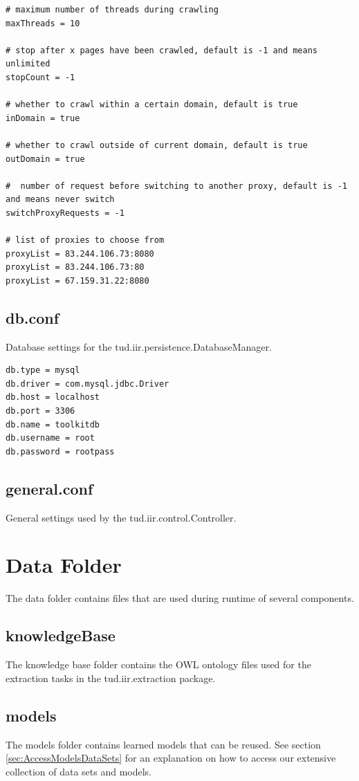 \documentclass[a4paper,twoside]{book}      %
\begin{document}
\begin{verbatim}
# maximum number of threads during crawling
maxThreads = 10

# stop after x pages have been crawled, default is -1 and means unlimited
stopCount = -1

# whether to crawl within a certain domain, default is true
inDomain = true
	
# whether to crawl outside of current domain, default is true
outDomain = true

#  number of request before switching to another proxy, default is -1 and means never switch
switchProxyRequests = -1
	
# list of proxies to choose from
proxyList = 83.244.106.73:8080
proxyList = 83.244.106.73:80
proxyList = 67.159.31.22:8080
\end{verbatim}

\subsection{db.conf}
Database settings for the tud.iir.persistence.DatabaseManager.

\begin{verbatim}
db.type = mysql
db.driver = com.mysql.jdbc.Driver
db.host = localhost
db.port = 3306
db.name = toolkitdb
db.username = root
db.password = rootpass
\end{verbatim}

\subsection{general.conf}
General settings used by the tud.iir.control.Controller.

\section{Data Folder}
The data folder contains files that are used during runtime of several components.

\subsection{knowledgeBase} 
The knowledge base folder contains the OWL ontology files used for the extraction tasks in the tud.iir.extraction package.

\subsection{models}
The models folder contains learned models that can be reused. See section \ref{sec:AccessModelsDataSets} for an explanation on how to access our extensive collection of data sets and models.
\end{document}
